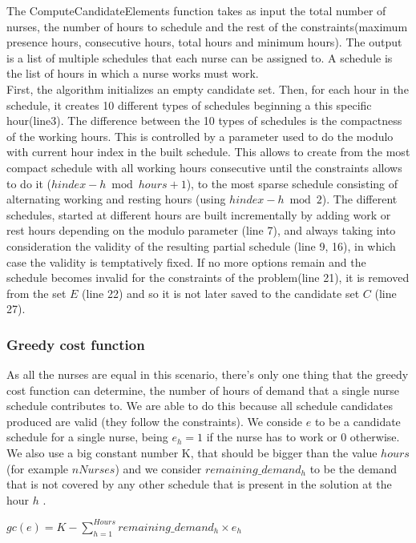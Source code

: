 The ComputeCandidateElements function takes as input the total number of nurses, the number of hours to schedule and the rest of the constraints(maximum presence hours, consecutive hours, total hours and minimum hours). The output is a list of multiple schedules that each nurse can be assigned to. A schedule is the list of hours in which a nurse works must work.\\
First, the algorithm initializes an empty candidate set. 
Then, for each hour in the schedule, it creates 10 different types of schedules beginning a this specific hour(line3). The difference between the 10 types of schedules is the compactness of the working hours. This is controlled by a parameter used to do the modulo with current hour index in the built schedule. This allows to create from the most compact schedule with all working hours consecutive until the constraints allows to do it ($hindex - h \bmod hours + 1$), to the most sparse schedule consisting of alternating working and resting hours (using $ hindex -h  \bmod 2$).
The different schedules, started at different hours are built incrementally by adding work or rest hours depending on the modulo parameter (line 7), and always taking into consideration the validity of the resulting partial schedule (line 9, 16), in which case the validity is temptatively fixed. If no more options remain and the schedule becomes invalid for the constraints of the problem(line 21), it is removed from the set $E$ (line 22) and so it is not later saved to the candidate set $C$ (line 27).

\subsubsection{Greedy cost function}

As all the nurses are equal in this scenario, there's only one thing that the greedy cost function can determine, the number of hours of demand that a single nurse schedule contributes to. We are able to do this because all schedule candidates produced are valid (they follow the constraints). We conside $e$ to be a candidate schedule for a single nurse, being $e_{h} = 1$ if the nurse has to work or 0 otherwise. We also use a big constant number K, that should be bigger than the value $hours$ (for example $nNurses$) and we consider $remaining\_demand_h$ to be the demand that is not covered by any other schedule that is present in the solution at the hour $h$	.

\begin{center}
 $ gc(e) = K - \sum_{h=1}^{Hours} remaining\_demand_h \times e_{h}$
\end{center}

